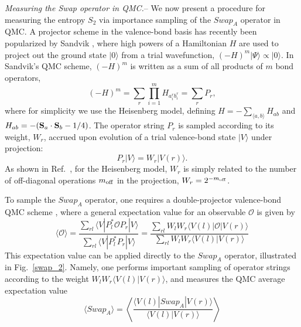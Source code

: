 \documentclass[prl,aps,twocolumn,floatfix,amsmath,amssymb,superscriptaddress,tightenlines]{revtex4}
\begin{document}
{\it Measuring the Swap operator in QMC.}--
We now present a procedure for measuring the entropy $S_2$ via importance sampling of the $Swap_A$ operator in QMC.  A
projector scheme in the valence-bond basis has recently been popularized by Sandvik \cite{Sandvik}, where high powers of
a Hamiltonian $H$ are used to project out the ground state $|0\rangle$ from a trial wavefunction, 
$(-H)^m|\Psi \rangle \propto |0\rangle$.  In Sandvik's QMC scheme, $(-H)^m$ is written as a sum of all products of $m$ bond
operators,
\begin{equation}
(-H)^m = \sum_r \prod_{i=1}^m H_{a_i^r b_i^r} = \sum_r P_r,
\end{equation}
where for simplicity we use the Heisenberg model, defining $H=-\sum_{\langle a,b \rangle}H_{ab}$ and 
$H_{ab} = -({\bf S}_a \cdot {\bf S}_b - 1/4)$.  The operator string $P_r$ is sampled according to its weight, $W_r$, accrued upon
evolution of a trial valence-bond state $|V \rangle$ under projection:
\begin{equation}
P_r |V \rangle = W_r |V(r) \rangle.
\end{equation}
As shown in Ref.~\cite{Sandvik}, for the Heisenberg model, $W_r$ is simply related to the number of off-diagonal 
operations $m_{\rm off}$ in the projection, $W_r = 2^{-m_{\rm off}}$.

To sample the $Swap_A$ operator, one requires a double-projector valence-bond QMC scheme \cite{Sandvik}, where
a general expectation value for an observable $\mathcal{O}$ is given by
\begin{equation}
\label{expect}
\langle \mathcal{O} \rangle = \frac{\sum_{rl} \langle V | P_l^* \mathcal{O} P_r | V \rangle} {\sum_{rl} \langle V | P_l^* P_r | V \rangle} 
= \frac{\sum_{rl} W_l W_r \langle V(l) | \mathcal{O} | V(r) \rangle} {\sum_{rl} W_l W_r \langle V(l) | V(r) \rangle}
\end{equation} 
This expectation value can be applied directly to the $Swap_A$ operator, illustrated in Fig.~\ref{swap_2}.  Namely, one 
performs important sampling of operator strings according to the weight $W_l W_r \langle V(l) | V(r) \rangle$, and measures
the QMC average expectation value
\begin{equation}
\langle Swap_A \rangle =  \left\langle{ \frac{ \langle V(l) | Swap_A | V(r) \rangle}{\langle V(l) | V(r) \rangle}  }\right\rangle 
\end{equation}
\end{document}
